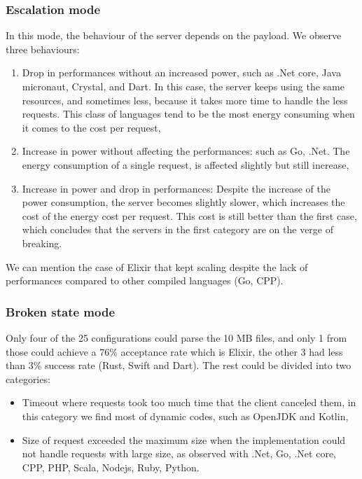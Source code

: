 \subsubsection{Escalation mode}
In this mode, the behaviour of the server depends on the payload. We observe three behaviours:
\begin{enumerate}
    \item Drop in performances without an increased power, such as .Net core, Java micronaut, Crystal, and Dart.
          In this case, the server keeps using the same resources, and sometimes less, because it takes more time to handle the less requests.
          This class of languages tend to be the most energy consuming when it comes to the cost per request,
    \item Increase in power without affecting the performances: such as Go, .Net.
          The energy consumption of a single request, is affected slightly but still increase,
    \item Increase in power and drop in performances: Despite the increase of the power consumption, the server becomes slightly slower, which increases the cost of the energy cost per request.
          This cost is still better than the first case, which concludes that the servers in the first category are on the verge of breaking.
\end{enumerate}

We can mention the case of Elixir that kept scaling despite the lack of performances compared to other compiled languages (Go, CPP).

\subsubsection{Broken state mode }
Only four of the 25 configurations could parse the 10 MB files, and only 1 from those could achieve a 76\% acceptance rate which is Elixir, the other 3 had less than 3\% success rate (Rust, Swift and Dart).
The rest could be divided into two categories:
\begin{itemize}
    \item \textsf{Timeout} where requests took too much time that the client canceled them, in this category we find most of dynamic codes, such as OpenJDK and Kotlin,
    \item \textsf{Size of request} exceeded the maximum size when the implementation could not handle requests with large size, as observed with .Net, Go, .Net core, CPP, PHP, Scala, Nodejs, Ruby, Python.
\end{itemize}



